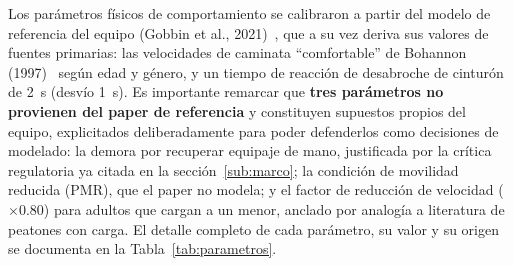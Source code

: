 \documentclass[a4paper, 11pt]{article}
\begin{document}
Los par\'ametros f\'isicos de comportamiento se calibraron a partir del modelo de
referencia del equipo (Gobbin et al., 2021)~\cite{gobbin2021}, que a su vez deriva
sus valores de fuentes primarias: las velocidades de caminata ``comfortable'' de
Bohannon (1997)~\cite{bohannon1997} seg\'un edad y g\'enero, y un tiempo de
reacci\'on de desabroche de cintur\'on de 2~s (desv\'io 1~s). Es importante
remarcar que \textbf{tres par\'ametros no provienen del paper de referencia} y
constituyen supuestos propios del equipo, explicitados deliberadamente para poder
defenderlos como decisiones de modelado: la demora por recuperar equipaje de mano,
justificada por la cr\'itica regulatoria ya citada en la secci\'on~\ref{sub:marco}; la
condici\'on de movilidad reducida (PMR), que el paper no modela; y el factor de
reducci\'on de velocidad ($\times$0.80) para adultos que cargan a un menor, anclado
por analog\'ia a literatura de peatones con carga. El detalle completo de cada
par\'ametro, su valor y su origen se documenta en la Tabla~\ref{tab:parametros}.
\end{document}
